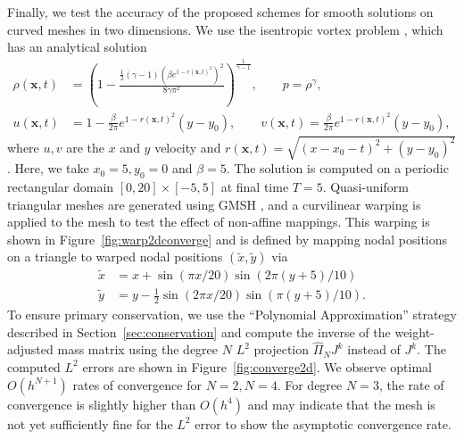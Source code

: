 \documentclass[preprint,10pt]{article}
\theoremstyle{definition}
\theoremstyle{lemma}
\theoremstyle{theorem}
\theoremstyle{assumption}
\renewcommand{\hat}{\widehat}
\renewcommand{\tilde}{\widetilde}
\newcommand{\LRp}[1]{\left( #1 \right)}
\begin{document}
{Finally, we test the accuracy of the proposed schemes for smooth solutions on curved meshes in two dimensions.  
We use the isentropic vortex problem \cite{shu1998essentially}, which has an analytical solution 
\begin{align}
\rho(\bm{x},t) &= \LRp{1 - \frac{\frac{1}{2}(\gamma-1)(\beta e^{1-r(\bm{x},t)^2})^2}{8\gamma \pi^2}}^{\frac{1}{\gamma-1}}, \qquad p = \rho^{\gamma},\\
u(\bm{x},t) &= 1 - \frac{\beta}{2\pi} e^{1-r(\bm{x},t)^2}(y-y_0), \qquad v(\bm{x},t) = \frac{\beta}{2\pi} e^{1-r(\bm{x},t)^2}(y-y_0),\nonumber
\end{align}
where $u, v$ are the $x$ and $y$ velocity and $r(\bm{x},t) = \sqrt{(x-x_0-t)^2 + (y-y_0)^2}$.  Here, we take $x_0 = 5, y_0 = 0$ and $\beta = 5$.  
The solution is computed on a periodic rectangular domain $[0, 20] \times [-5,5]$ at final time $T=5$.  Quasi-uniform triangular meshes are generated using \textsc{GMSH} \cite{geuzaine2009gmsh}, and a curvilinear warping is applied to the mesh to test the effect of non-affine mappings.  This warping is shown in Figure~\ref{fig:warp2dconverge} and is defined by mapping nodal positions on a triangle to warped nodal positions $(\tilde{x},\tilde{y})$ via
\begin{align*}
\tilde{x} &= x + \sin\LRp{\pi x / 20}\sin\LRp{2\pi (y+5)/10}\\
\tilde{y} &= y - \frac{1}{2}\sin\LRp{2 \pi x / 20}\sin\LRp{\pi (y+5)/10}.
\end{align*}  
To ensure primary conservation, we use the ``Polynomial Approximation'' strategy described in Section~\ref{sec:conservation} and compute the inverse of the weight-adjusted mass matrix using the degree $N$ $L^2$ projection $\hat{\Pi}_N J^k$ instead of $J^k$.  The computed $L^2$ errors are shown in Figure~\ref{fig:converge2d}.  We observe optimal $O(h^{N+1})$ rates of convergence for $N=2, N= 4$.  For degree $N=3$, the rate of convergence is slightly higher than $O(h^{4})$ and may indicate that the mesh is not yet sufficiently fine for the $L^2$ error to show the asymptotic convergence rate.  


\begin{figure}
\centering
{}
\end{figure}}
\end{document}
